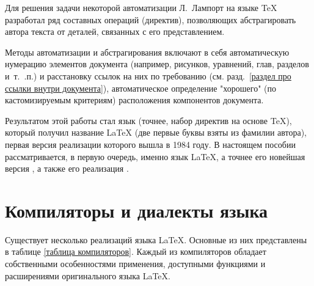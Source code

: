 \documentclass[workbook]{fefudoc}
\begin{document}
Для решения задачи некоторой автоматизации Л.~Лампорт на языке \TeX{} разработал ряд составных операций (директив), позволяющих абстрагировать автора текста от деталей, связанных с его представлением.

Методы автоматизации и абстрагирования включают в себя автоматическую нумерацию элементов документа (например, рисунков, уравнений, глав, разделов и~т.~.п.) и расстановку ссылок на них по требованию (см. разд.~\ref{раздел про ссылки внутри документа}), автоматическое определение "хорошего" (по кастомизируемым критериям) расположения компонентов документа.

Результатом этой работы стал язык (точнее, набор директив на основе \TeX{}), который получил название \LaTeX{} (две первые буквы взяты из фамилии автора), первая версия реализации которого вышла в 1984 году.
В настоящем пособии рассматривается, в первую очередь, именно язык \LaTeX{}, а точнее его новейшая версия \LaTeXe{}, а также его реализация \XeLaTeX{}.

\section{Компиляторы и диалекты языка}\label{раздел про компиляторы}
Существует несколько реализаций языка \LaTeX{}.
Основные из них представлены в таблице \ref{таблица компиляторов}.
Каждый из компиляторов обладает собственными особенностями применения, доступными функциями и расширениями оригинального языка \LaTeX{}.
\end{document}
